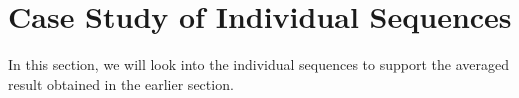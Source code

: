 \section{Case Study of Individual Sequences}
\label{sec:results/section_b}

In this section, we will look into the individual sequences to support the averaged result obtained in the earlier section. 